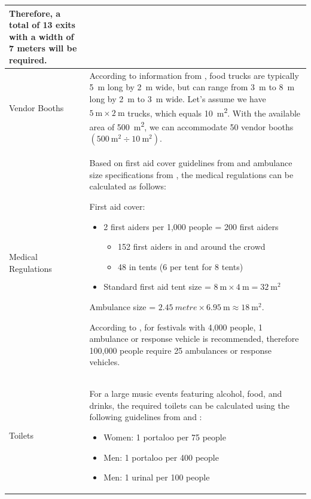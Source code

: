 \begin{longtable}{|p{1.5cm}|p{14cm}|}
                Therefore, a total of 13 exits with a width of 7 meters will be required.
            \\
            \hline
            Vendor Booths &
                According to information from \citet{jjones2023}, food trucks are typically \SI{5}{\metre} long by \SI{2}{\metre} wide, but can range from \SI{3}{\metre} to \SI{8}{\metre} long by \SI{2}{\metre} to \SI{3}{\metre} wide. Let's assume we have $\SI{5}{\metre} \times \SI{2}{\metre}$ trucks, which equals \SI{10}{\metre\squared}. With the available area of \SI{500}{\metre\squared}, we can accommodate 50 vendor booths $(\SI{500}{\metre\squared} \div \SI{10}{\metre\squared})$.
            \\
            \hline
            Medical Regulations &
                Based on first aid cover guidelines from \citet{sja2023} and ambulance size specifications from \citet{nhs-ambulance-specs}, the medical regulations can be calculated as follows:

                First aid cover:
                \begin{itemize}
                    \item 2 first aiders per 1,000 people = 200 first aiders
                    \begin{itemize}
                        \item 152 first aiders in and around the crowd
                        \item 48 in tents (6 per tent for 8 tents)
                    \end{itemize}
                    \item Standard first aid tent size = $\SI{8}{\metre} \times \SI{4}{\metre} = \SI{32}{\metre\squared}$
                \end{itemize}

                Ambulance size = $\SI{2.45}{metre} \times \SI{6.95}{\metre} \approx \SI{18}{\metre\squared}$.

                According to \citet{hmas-festivals}, for festivals with 4,000 people, 1 ambulance or response vehicle is recommended, therefore 100,000 people require 25 ambulances or response vehicles.
            \\
            \hline
            Toilets &
                For a large music events featuring alcohol, food, and drinks, the required toilets can be calculated using the following guidelines from \citet{lsharp2023} and \citet{andyloos2015}:

                \begin{itemize}
                    \item Women: 1 portaloo per 75 people
                    \item Men: 1 portaloo per 400 people
                    \item Men: 1 urinal per 100 people
                \end{itemize}
                

\end{longtable}
